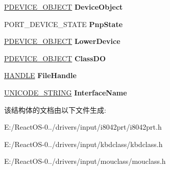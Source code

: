 \begin{DoxyCompactItemize}
\hyperlink{struct___d_e_v_i_c_e___o_b_j_e_c_t}{P\+D\+E\+V\+I\+C\+E\+\_\+\+O\+B\+J\+E\+CT} {\bfseries Device\+Object}
\item 
\mbox{\label{struct___p_o_r_t___d_e_v_i_c_e___e_x_t_e_n_s_i_o_n_a51429c9f45fba3b9de73a60a773bc15c}} 
P\+O\+R\+T\+\_\+\+D\+E\+V\+I\+C\+E\+\_\+\+S\+T\+A\+TE {\bfseries Pnp\+State}
\item 
\mbox{\label{struct___p_o_r_t___d_e_v_i_c_e___e_x_t_e_n_s_i_o_n_aee6c64c78535299bfee62ab972be8513}} 
\hyperlink{struct___d_e_v_i_c_e___o_b_j_e_c_t}{P\+D\+E\+V\+I\+C\+E\+\_\+\+O\+B\+J\+E\+CT} {\bfseries Lower\+Device}
\item 
\mbox{\label{struct___p_o_r_t___d_e_v_i_c_e___e_x_t_e_n_s_i_o_n_aa1f2d0191354bcbf16246fa79a5a1d9c}} 
\hyperlink{struct___d_e_v_i_c_e___o_b_j_e_c_t}{P\+D\+E\+V\+I\+C\+E\+\_\+\+O\+B\+J\+E\+CT} {\bfseries Class\+DO}
\item 
\mbox{\label{struct___p_o_r_t___d_e_v_i_c_e___e_x_t_e_n_s_i_o_n_a3c17c5b3543978f513c5719d2ba7a16d}} 
\hyperlink{interfacevoid}{H\+A\+N\+D\+LE} {\bfseries File\+Handle}
\item 
\mbox{\label{struct___p_o_r_t___d_e_v_i_c_e___e_x_t_e_n_s_i_o_n_a3d55680124781d5e37f8813a23145d66}} 
\hyperlink{struct___u_n_i_c_o_d_e___s_t_r_i_n_g}{U\+N\+I\+C\+O\+D\+E\+\_\+\+S\+T\+R\+I\+NG} {\bfseries Interface\+Name}
\end{DoxyCompactItemize}


该结构体的文档由以下文件生成\+:\begin{DoxyCompactItemize}
\item 
E\+:/\+React\+O\+S-\/0../drivers/input/i8042prt/i8042prt.\+h\item 
E\+:/\+React\+O\+S-\/0../drivers/input/kbdclass/kbdclass.\+h\item 
E\+:/\+React\+O\+S-\/0../drivers/input/mouclass/mouclass.\+h\end{DoxyCompactItemize}

